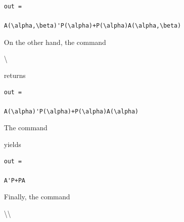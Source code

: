 \documentclass[english,11pt]{article}
\theoremstyle{break} \theorembodyfont{\small\rm}
\begin{document}
\begin{minipage}{12.2cm}
\begin{lstlisting}[rulecolor=\color{red}]
out = 

A(\alpha,\beta)'P(\alpha)+P(\alpha)A(\alpha,\beta)
\end{lstlisting}
\end{minipage}

\vspace{0.2cm}

On the other hand, the command

\vspace{0.5cm}%
\begin{minipage}{20.5cm}
\textbackslash{}
\end{minipage}
\vspace{0.2cm}

\noindent returns

\begin{minipage}{12.2cm}
\begin{lstlisting}[rulecolor=\color{red}]
out = 

A(\alpha)'P(\alpha)+P(\alpha)A(\alpha)
\end{lstlisting}
\end{minipage}


\vspace{0.2cm}

The command

\vspace{0.5cm}%
\begin{minipage}{20.5cm}
\end{minipage}
\vspace{0.2cm}

\noindent yields

\begin{minipage}{12.2cm}
\begin{lstlisting}[rulecolor=\color{red}]
out = 

A'P+PA
\end{lstlisting}
\end{minipage}

\vspace{0.2cm}

Finally, the command

\vspace{0.5cm}%
\begin{minipage}{20.5cm}
\textbackslash{}\textbackslash{}
\end{minipage}
\vspace{0.2cm}
\end{document}
